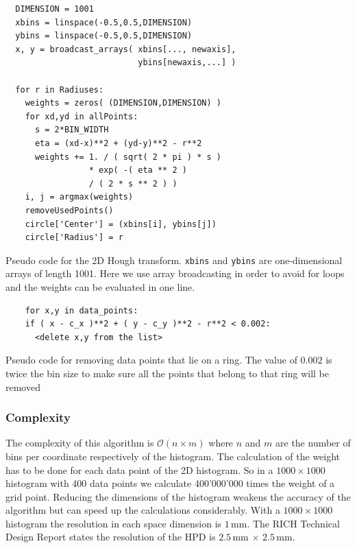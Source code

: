 \documentclass[11pt]{scrreprt}
\begin{document}
\begin{codesnippet}[htb]
\begin{lstlisting}
  DIMENSION = 1001
  xbins = linspace(-0.5,0.5,DIMENSION)
  ybins = linspace(-0.5,0.5,DIMENSION)
  x, y = broadcast_arrays( xbins[..., newaxis], 
                           ybins[newaxis,...] )

  for r in Radiuses:
    weights = zeros( (DIMENSION,DIMENSION) )
    for xd,yd in allPoints:
      s = 2*BIN_WIDTH
      eta = (xd-x)**2 + (yd-y)**2 - r**2      
      weights += 1. / ( sqrt( 2 * pi ) * s ) 
                 * exp( -( eta ** 2 ) 
                 / ( 2 * s ** 2 ) )
    i, j = argmax(weights)
    removeUsedPoints()
    circle['Center'] = (xbins[i], ybins[j])
    circle['Radius'] = r
\end{lstlisting}
  \caption[Pseudo code 2D HT]{Pseudo code for the 2D Hough transform. \texttt{xbins} and \texttt{ybins} are one-dimensional arrays of length 1001. Here we use array 
  broadcasting in order to avoid for loops and the weights can be evaluated in one line.}
\end{codesnippet}


\begin{codesnippet}
\begin{lstlisting}
    for x,y in data_points:
    if ( x - c_x )**2 + ( y - c_y )**2 - r**2 < 0.002:
      <delete x,y from the list>
\end{lstlisting}
\caption{Pseudo code for removing data points that lie on a ring. The value of $0.002$ is twice the bin size to make sure all the points that
belong to that ring will be removed}\label{lst:remove_points}
\end{codesnippet}

\subsubsection{Complexity} %
\label{ssub:complexity_2d}
The complexity of this algorithm is $\mathcal{O}(n\times m)$ where $n$ and $m$ are the number of bins per coordinate respectively of 
the histogram. The calculation of the weight has to be done for each data point of the 2D histogram. So in a $1000\times 1000$ histogram 
with 400 data points we calculate 400'000'000 times the weight of a grid point. Reducing the dimensions of the histogram weakens the 
accuracy of the algorithm but can speed up the calculations considerably. With a $1000\times 1000$ histogram the resolution in each 
space dimension is $1$\,mm. The RICH Technical Design Report states the resolution of the HPD is $2.5$\,mm $\times$ $2.5$\,mm.
\end{document}
